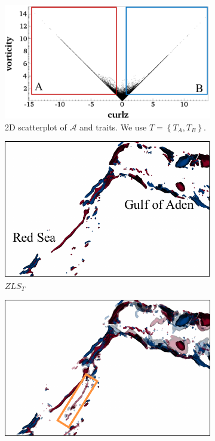 \begin{figure}[!h]
\begin{subfigure}{0.24\linewidth}
\centering
\includegraphics[width=0.95\linewidth]{Images/RedSeaEddy/scatterplot.pdf}
\vspace{-1mm}
\caption{2D scatterplot of $\mathcal{A}$ and traits. We use $T = \left\{T_{A}, T_{B}\right\}$.} 
\label{fig:rse_scatterplot}
\end{subfigure}
\hfill
\begin{subfigure}{0.245\linewidth}
\centering
\includegraphics[width=\linewidth]{Images/RedSeaEddy/zls.pdf}
\vspace{-5mm}
\caption{$ZLS_{T}$}
\label{fig:rse_zls}
\end{subfigure}
\begin{subfigure}{0.245\linewidth}
\centering
\includegraphics[width=\linewidth]{Images/RedSeaEddy/fcls_50.pdf}

\end{subfigure}
\end{figure}
